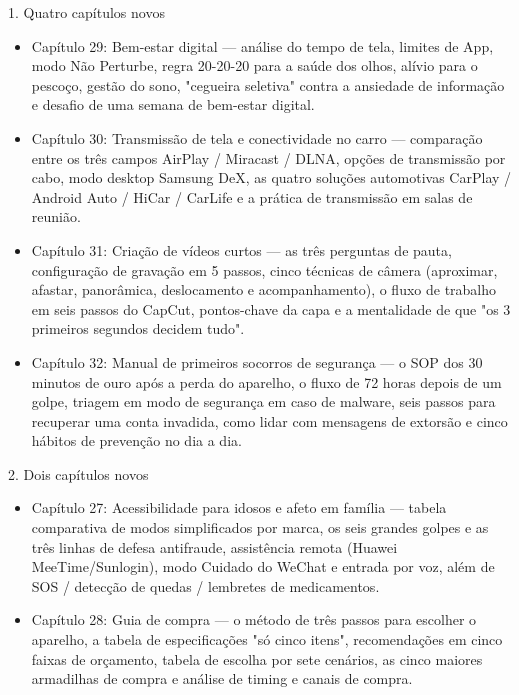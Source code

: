 
1. Quatro capítulos novos

\begin{itemize}
  \item Capítulo 29: Bem-estar digital — análise do tempo de tela, limites de App, modo Não Perturbe, regra 20-20-20 para a saúde dos olhos, alívio para o pescoço, gestão do sono, "cegueira seletiva" contra a ansiedade de informação e desafio de uma semana de bem-estar digital.
  \item Capítulo 30: Transmissão de tela e conectividade no carro — comparação entre os três campos AirPlay / Miracast / DLNA, opções de transmissão por cabo, modo desktop Samsung DeX, as quatro soluções automotivas CarPlay / Android Auto / HiCar / CarLife e a prática de transmissão em salas de reunião.
  \item Capítulo 31: Criação de vídeos curtos — as três perguntas de pauta, configuração de gravação em 5 passos, cinco técnicas de câmera (aproximar, afastar, panorâmica, deslocamento e acompanhamento), o fluxo de trabalho em seis passos do CapCut, pontos-chave da capa e a mentalidade de que "os 3 primeiros segundos decidem tudo".
  \item Capítulo 32: Manual de primeiros socorros de segurança — o SOP dos 30 minutos de ouro após a perda do aparelho, o fluxo de 72 horas depois de um golpe, triagem em modo de segurança em caso de malware, seis passos para recuperar uma conta invadida, como lidar com mensagens de extorsão e cinco hábitos de prevenção no dia a dia.
\end{itemize}

2. Dois capítulos novos

\begin{itemize}
  \item Capítulo 27: Acessibilidade para idosos e afeto em família — tabela comparativa de modos simplificados por marca, os seis grandes golpes e as três linhas de defesa antifraude, assistência remota (Huawei MeeTime/Sunlogin), modo Cuidado do WeChat e entrada por voz, além de SOS / detecção de quedas / lembretes de medicamentos.
  \item Capítulo 28: Guia de compra — o método de três passos para escolher o aparelho, a tabela de especificações "só cinco itens", recomendações em cinco faixas de orçamento, tabela de escolha por sete cenários, as cinco maiores armadilhas de compra e análise de timing e canais de compra.
\end{itemize}

